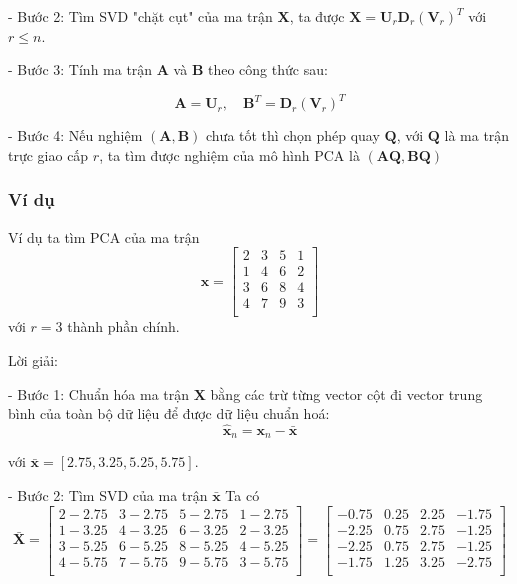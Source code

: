 \documentclass[14pt,oneside,a4paper]{report}
\numberwithin{equation}{section}
\begin{document}
- Bước 2: Tìm SVD "chặt cụt" của ma trận $\mathbf{X}$, ta được $\mathbf{X}=\mathbf{U}_{r} \mathbf{D}_{r}\left(\mathbf{V}_{r}\right)^{T}$ với $r \leq n$.

- Bước 3: Tính ma trận $\mathbf{A}$ và $\mathbf{B}$ theo công thức sau:

$$
\mathbf{A} =  \mathbf{U}_{r}, \quad \mathbf{B}^{T}= \mathbf{D}_{r}\left(\mathbf{V}_{r}\right)^{T}
$$

- Bước 4: Nếu nghiệm $(\mathbf{A, B})$ chưa tốt thì chọn phép quay $\mathbf{Q}$, với $\mathbf{Q}$ là ma trận trực giao cấp $r$, ta tìm được nghiệm của mô hình $\mathrm{PCA}$ là $(\mathbf{A Q, B Q})$

\subsubsection{Ví dụ}
Ví dụ ta tìm PCA của ma trận\[
\mathbf{x} = \begin{bmatrix}
2 & 3 & 5 & 1 \\
1 & 4 & 6 & 2 \\
3 & 6 & 8 & 4 \\
4 & 7 & 9 & 3 \\
\end{bmatrix}
\] với $r=3$ thành phần chính.

Lời giải:

- Bước 1: Chuẩn hóa ma trận $\mathbf{X}$ bằng các trừ từng vector cột đi vector trung bình của toàn bộ dữ liệu để được dữ
liệu chuẩn hoá:
\begin{equation}
\hat{\mathbf{x}}_n = \mathbf{x}_n - \bar{\mathbf{x}}
\end{equation}


với $\bar{\mathbf{x}} = \left[ 2.75, 3.25, 5.25, 5.75 \right]$.

- Bước 2: Tìm SVD của ma trận $\bar{\mathbf{x}}$
Ta có
$$
\bar{\mathbf{X}}=\begin{bmatrix}
2-2.75 & 3-2.75 & 5-2.75 & 1-2.75 \\
1-3.25 & 4-3.25 & 6-3.25 & 2-3.25 \\
3-5.25 & 6-5.25 & 8-5.25 & 4-5.25 \\
4-5.75 & 7-5.75 & 9-5.75 & 3-5.75 \\
\end{bmatrix} = \begin{bmatrix}
-0.75 & 0.25 & 2.25 & -1.75 \\
-2.25 & 0.75 & 2.75 & -1.25 \\
-2.25 & 0.75 & 2.75 & -1.25 \\
-1.75 & 1.25 & 3.25 & -2.75 \\
\end{bmatrix}
$$
\end{document}
